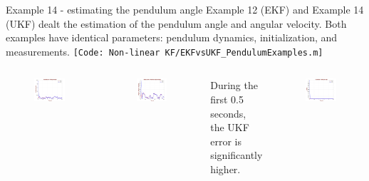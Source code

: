 \begin{frame}{Example 14 - estimating the pendulum angle}
Example 12 (EKF) and Example 14 (UKF) dealt the estimation of the pendulum angle and angular
velocity. Both examples have identical parameters: pendulum dynamics, initialization, and measurements. \texttt{\tiny{[Code: Non-linear KF/EKFvsUKF\_PendulumExamples.m]}}
\begin{columns}
        \begin{figure}
            \centering
            \includegraphics[width=0.6\linewidth]{Figures//Part3/EKFvsUKF_AE_PendulumAngle.png}
        \end{figure}
        \vspace{-10pt}
        \begin{figure}
            \centering
            \includegraphics[width=0.6\linewidth]{Figures//Part3/EKFvsUKF_AE_PendulumAVelocity.png}
        \end{figure}
        During the first 0.5 seconds, the UKF error is significantly higher.
        \begin{figure}
            \centering
            \includegraphics[width=0.6\linewidth]{Figures//Part3/EKFvsUKF_Uncertainty_PendulumAngle.png}

\end{figure}
\end{columns}
\end{frame}
